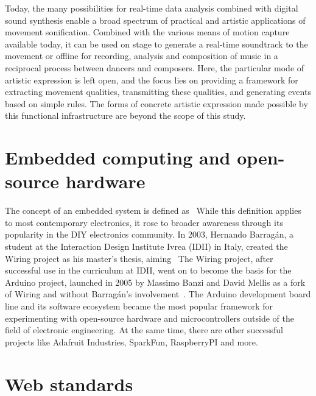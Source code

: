 Today, the many possibilities for real-time data analysis combined with digital sound synthesis enable a broad spectrum of practical and artistic applications of movement sonification.
Combined with the various means of motion capture available today, it can be used on stage to generate a real-time soundtrack to the movement or offline for recording, analysis and composition of music in a reciprocal process between dancers and composers.
Here, the particular mode of artistic expression is left open, and the focus lies on providing a framework for extracting movement qualities, transmitting these qualities, and generating events based on simple rules.
The forms of concrete artistic expression made possible by this functional infrastructure are beyond the scope of this study.

\section{Embedded computing and open-source hardware}
\label{sec:embeddedcomputing}

The concept of an embedded system is defined as~
While this definition applies to most contemporary electronics, it rose to broader awareness through its popularity in the \ac{DIY} electronics community.
In 2003, Hernando Barragán, a student at the Interaction Design Institute Ivrea (IDII) in Italy, created the Wiring project as his master's thesis, aiming~
The Wiring project, after successful use in the curriculum at IDII, went on to become the basis for the Arduino project, launched in 2005 by Massimo Banzi and David Mellis as a fork of Wiring and without Barragán's involvement~\parencite{arduinoHistory}.
The Arduino development board line and its software ecosystem became the most popular framework for experimenting with open-source hardware and microcontrollers outside of the field of electronic engineering.
At the same time, there are other successful projects like Adafruit Industries, SparkFun, RaspberryPI and more.


\section{Web standards}
\label{sec:webstandards}

